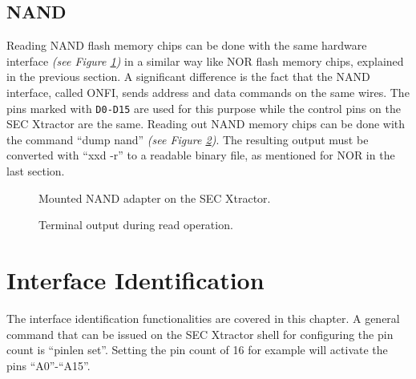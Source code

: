 \documentclass[a4paper]{report}
\begin{document}
\section{NAND}
Reading NAND flash memory chips can be done with the same hardware interface \textit{(see Figure \ref{fig:mounted_nand})} in a similar way like NOR flash memory chips, explained in the previous section.
A significant difference is the fact that the NAND interface, called ONFI, sends address and data commands on the same wires.
The pins marked with \texttt{D0-D15} are used for this purpose while the control pins on the SEC Xtractor are the same.
Reading out NAND memory chips can be done with the command ``dump nand'' \textit{(see Figure \ref{fig:terminal_nand})}. 
The resulting output must be converted with ``xxd -r'' to a readable binary file, as mentioned for NOR in the last section.
\begin{figure}[ht] 
  \centering
  {
   \setlength{\fboxsep}{0pt}
   \setlength{\fboxrule}{0.5pt}
  }
  \caption{Mounted NAND adapter on the SEC Xtractor.}
  \label{fig:mounted_nand}
\end{figure}
\begin{figure}[ht] 
  \centering
  {
   \setlength{\fboxsep}{0pt}
   \setlength{\fboxrule}{0.5pt}
  }
  \caption{Terminal output during read operation.}
  \label{fig:terminal_nand}
\end{figure}
\chapter{Interface Identification}
The interface identification functionalities are covered in this chapter.
A general command that can be issued on the SEC Xtractor shell for configuring the pin count is ``pinlen set''.
Setting the pin count of 16 for example will activate the pins ``A0''-``A15''.
\end{document}
